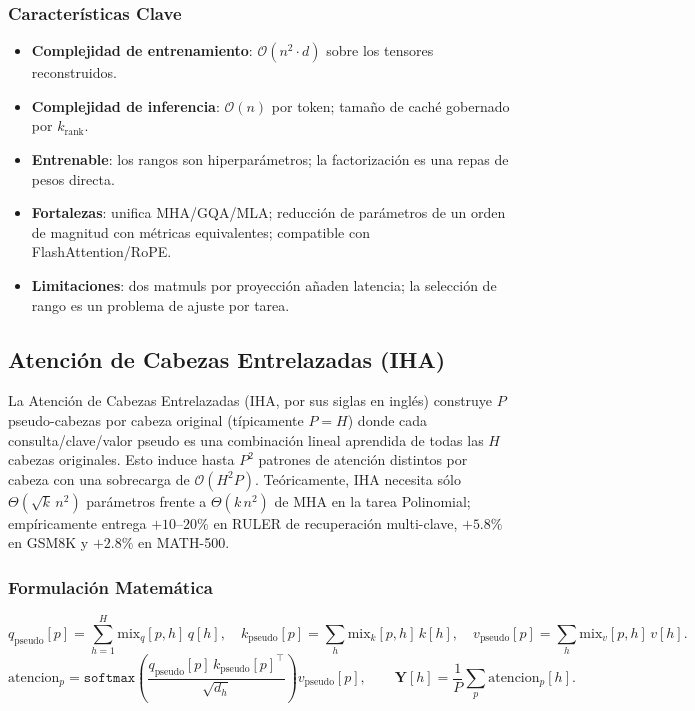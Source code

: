 \subsubsection{Características Clave}
\begin{itemize}[leftmargin=*]
    \item \textbf{Complejidad de entrenamiento}: $\mathcal{O}(n^2 \cdot d)$ sobre los tensores reconstruidos.
    \item \textbf{Complejidad de inferencia}: $\mathcal{O}(n)$ por token; tamaño de caché gobernado por $k_{\text{rank}}$.
    \item \textbf{Entrenable}: los rangos son hiperparámetros; la factorización es una repas de pesos directa.
    \item \textbf{Fortalezas}: unifica MHA/GQA/MLA; reducción de parámetros de un orden de magnitud con métricas equivalentes; compatible con FlashAttention/RoPE.
    \item \textbf{Limitaciones}: dos matmuls por proyección añaden latencia; la selección de rango es un problema de ajuste por tarea.
\end{itemize}

\subsection{Atención de Cabezas Entrelazadas (IHA)}
La Atención de Cabezas Entrelazadas (IHA, por sus siglas en inglés) \citep{duvvuri_iha_2026} construye $P$ pseudo-cabezas por cabeza original (típicamente $P = H$) donde cada consulta/clave/valor pseudo es una combinación lineal aprendida de todas las $H$ cabezas originales. Esto induce hasta $P^2$ patrones de atención distintos por cabeza con una sobrecarga de $\mathcal{O}(H^2 P)$. Teóricamente, IHA necesita sólo $\Theta(\sqrt{k}\, n^2)$ parámetros frente a $\Theta(k\, n^2)$ de MHA en la tarea Polinomial; empíricamente entrega $+10$--$20\%$ en RULER de recuperación multi-clave, $+5.8\%$ en GSM8K y $+2.8\%$ en MATH-500.

\subsubsection{Formulación Matemática}
\[
q_{\text{pseudo}}[p] = \sum_{h=1}^{H} \text{mix}_q[p, h]\, q[h], \quad
k_{\text{pseudo}}[p] = \sum_{h} \text{mix}_k[p, h]\, k[h], \quad
v_{\text{pseudo}}[p] = \sum_{h} \text{mix}_v[p, h]\, v[h].
\]
\[
\text{atencion}_p = \texttt{softmax}\!\left(\frac{q_{\text{pseudo}}[p]\, k_{\text{pseudo}}[p]^\top}{\sqrt{d_h}}\right) v_{\text{pseudo}}[p],
\qquad
\mathbf{Y}[h] = \frac{1}{P} \sum_{p} \text{atencion}_p[h].
\]

